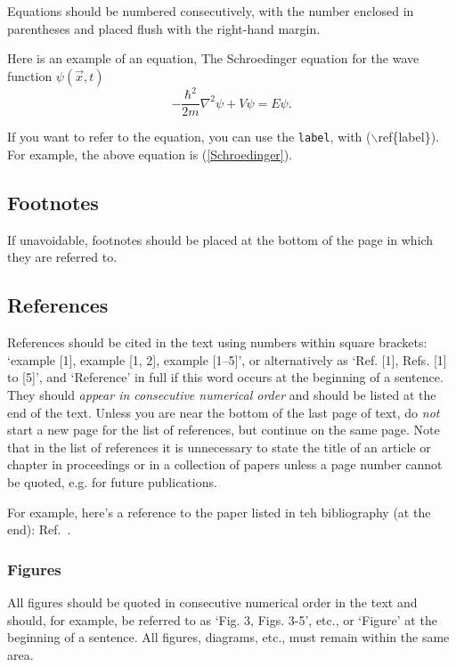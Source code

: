\documentclass[dvips]{article}
\begin{document}
Equations should be numbered consecutively, with the 
number enclosed in parentheses and placed flush with
the right-hand margin.

Here is an example of an equation, The Schroedinger
equation for the wave function $\psi(\vec{x},t)$
\begin{equation}\label{Schroedinger}
-\frac{\hbar^{2}}{2m}\nabla^{2}\psi+V\psi=E\psi.
\end{equation}

If you want to refer to the equation, you can use
the {\tt label}, with ($\backslash$ref\{label\}).
For example, the above equation is (\ref{Schroedinger}).

\subsection{Footnotes}

If unavoidable, footnotes should be placed at the bottom
of the page in which they are referred to.

\subsection{References}

References should be cited  in the text using numbers within
square brackets: `example [1],
example [1, 2], example [1--5]', or alternatively as
`Ref. [1], Refs. [1] to [5]', and
`Reference' in full if this word occurs at the
beginning of a sentence.
They should {\it appear in consecutive numerical order}
and should be listed at the end of the text.
Unless you are near the bottom of the last page of text,
do {\it not} start a new page for the list of
references, but continue on the same page.
Note that in the list of references it is
unnecessary to state the title of an article or chapter in
proceedings or in a collection of papers unless a page number
cannot be quoted, e.g. for future publications.

For example, here's a reference to the paper
listed in teh bibliography (at the end):
Ref.\ \cite{Stump}.

\subsubsection{Figures}

All figures should be quoted in consecutive numerical order
in the text and should, for example, be referred to as
`Fig. 3, Figs. 3-5', etc., or `Figure' at the beginning of a
sentence.
All figures, diagrams, etc., must remain within the same area.
\end{document}
